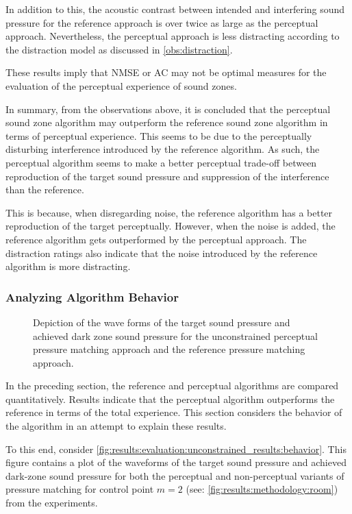 \begin{enumerate}
        In addition to this, the acoustic contrast between intended and interfering sound pressure for 
        the reference approach is over twice as large as the perceptual approach.
        Nevertheless, the perceptual approach is less distracting according to the distraction model as discussed in \autoref{obs:distraction}.

        These results imply that NMSE or AC may not be optimal measures for the evaluation of the perceptual experience of sound zones.
        \label{obs:physical}
\end{enumerate}

In summary, from the observations above, it is concluded that the perceptual sound zone algorithm may
outperform the reference sound zone algorithm in terms of perceptual experience.
This seems to be due to the perceptually disturbing interference introduced by the reference algorithm.
As such, the perceptual algorithm seems to make a better perceptual trade-off between reproduction of the target sound pressure and suppression of the interference than the reference.

This is because, when disregarding noise, the reference algorithm has a better reproduction of the target perceptually.
However, when the noise is added, the reference algorithm gets outperformed by the perceptual approach.
The distraction ratings also indicate that the noise introduced by the reference algorithm is more distracting.

\subsubsection*{Analyzing Algorithm Behavior}
\begin{figure}[]
    \centering
    
    \caption{Depiction of the wave forms of the target sound pressure and achieved dark zone sound pressure for the 
        unconstrained perceptual pressure matching approach and the reference pressure matching approach.}
        \label{fig:results:evaluation:unconstrained_results:behavior}
\end{figure}

In the preceding section, the reference and perceptual algorithms are compared quantitatively.
Results indicate that the perceptual algorithm outperforms the reference in terms of the total experience.
This section considers the behavior of the algorithm in an attempt to explain these results.

To this end, consider \autoref{fig:results:evaluation:unconstrained_results:behavior}.
This figure contains a plot of the waveforms of the target sound pressure and achieved dark-zone sound pressure 
for both the perceptual and non-perceptual variants of pressure matching for control point $m=2$ 
(see: \autoref{fig:results:methodology:room}) from the experiments.


